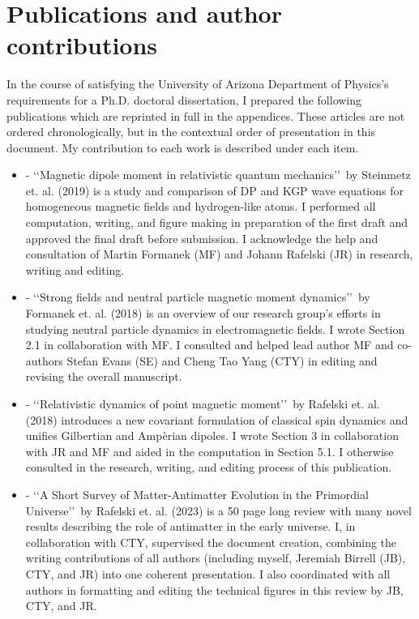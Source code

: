 \chapter*{Publications and author contributions}
\label{sec:pubs}
In the course of satisfying the University of Arizona Department of Physics's requirements for a Ph.D. doctoral dissertation, I prepared the following publications which are reprinted in full in the appendices. These articles are not ordered chronologically, but in the contextual order of presentation in this document. My contribution to each work is described under each item.
\begin{itemize}
    \item {} - \lq\lq Magnetic dipole moment in relativistic quantum mechanics\rq\rq\ by Steinmetz et. al. (2019) is a study and comparison of DP and KGP wave equations for homogeneous magnetic fields and hydrogen-like atoms. I performed all computation, writing, and figure making in preparation of the first draft and approved the final draft before submission. I acknowledge the help and consultation of Martin Formanek (MF) and Johann Rafelski (JR) in research, writing and editing.
    \item {} - \lq\lq Strong fields and neutral particle magnetic moment dynamics\rq\rq\ by Formanek et. al. (2018) is an overview of our research group's efforts in studying neutral particle dynamics in electromagnetic fields. I wrote Section 2.1 in collaboration with MF. I consulted and helped lead author MF and co-authors Stefan Evans (SE) and Cheng Tao Yang (CTY) in editing and revising the overall manuscript.
    \item {} - \lq\lq Relativistic dynamics of point magnetic moment\rq\rq\ by Rafelski et. al. (2018) introduces a new covariant formulation of classical spin dynamics and unifies Gilbertian and Amp{\`e}rian dipoles. I wrote Section 3 in collaboration with JR and MF and aided in the computation in Section 5.1. I otherwise consulted in the research, writing, and editing process of this publication. 
    \item {} - \lq\lq A Short Survey of Matter-Antimatter Evolution in the Primordial Universe\rq\rq\ by Rafelski et. al. (2023) is a 50 page long review with many novel results describing the role of antimatter in the early universe. I, in collaboration with CTY,  supervised the document creation, combining the writing contributions of all authors (including myself, Jeremiah Birrell (JB), CTY, and JR) into one coherent presentation. I also coordinated with all authors in formatting and editing the technical figures in this review by JB, CTY, and JR.

\end{itemize}
